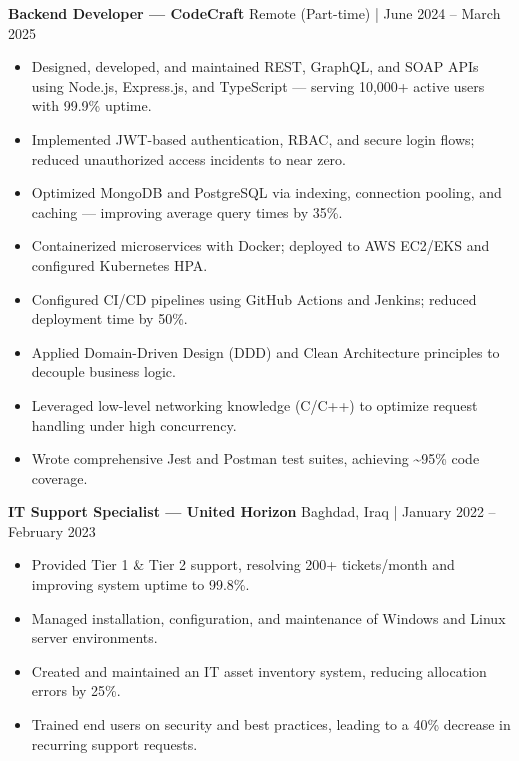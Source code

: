 \documentclass[10pt, a4paper]{article}
\begin{document}
\vspace{1.5mm}
\noindent\textbf{Backend Developer — CodeCraft} \hfill Remote (Part-time) | June 2024 – March 2025
\begin{itemize}
    \item Designed, developed, and maintained REST, GraphQL, and SOAP APIs using Node.js, Express.js, and TypeScript — serving 10,000+ active users with 99.9\% uptime.
    \item Implemented JWT-based authentication, RBAC, and secure login flows; reduced unauthorized access incidents to near zero.
    \item Optimized MongoDB and PostgreSQL via indexing, connection pooling, and caching — improving average query times by 35\%.
    \item Containerized microservices with Docker; deployed to AWS EC2/EKS and configured Kubernetes HPA.
    \item Configured CI/CD pipelines using GitHub Actions and Jenkins; reduced deployment time by 50\%.
    \item Applied Domain-Driven Design (DDD) and Clean Architecture principles to decouple business logic.
    \item Leveraged low-level networking knowledge (C/C++) to optimize request handling under high concurrency.
    \item Wrote comprehensive Jest and Postman test suites, achieving \textasciitilde95\% code coverage.
\end{itemize}

\vspace{1.5mm}
\noindent\textbf{IT Support Specialist — United Horizon} \hfill Baghdad, Iraq | January 2022 – February 2023
\begin{itemize}
    \item Provided Tier 1 \& Tier 2 support, resolving 200+ tickets/month and improving system uptime to 99.8\%.
    \item Managed installation, configuration, and maintenance of Windows and Linux server environments.
    \item Created and maintained an IT asset inventory system, reducing allocation errors by 25\%.
    \item Trained end users on security and best practices, leading to a 40\% decrease in recurring support requests.
\end{itemize}

\end{document}
